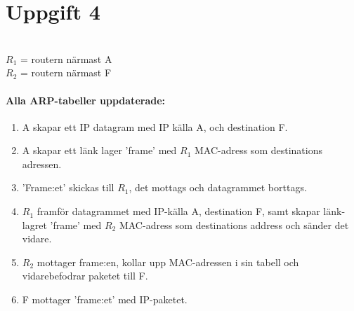 \section{Uppgift 4}
\\ $R_1$ = routern närmast A
\\ $R_2$ = routern närmast F

\paragraph{Alla ARP-tabeller uppdaterade:}
\begin{enumerate}
    \item A skapar ett IP datagram med IP källa A, och destination F.
    \item A skapar ett länk lager 'frame' med $R_1$ MAC-adress som destinations adressen.
    \item 'Frame:et' skickas till $R_1$, det mottags och datagrammet borttags.
    \item $R_1$ framför datagrammet med IP-källa A, destination F, samt skapar länk-lagret
	'frame' med $R_2$ MAC-adress som destinations address och sänder det vidare.
    \item $R_2$ mottager frame:en, kollar upp MAC-adressen i sin tabell och vidarebefodrar
	paketet till F. 
    \item F mottager 'frame:et' med IP-paketet.

\end{enumerate}
